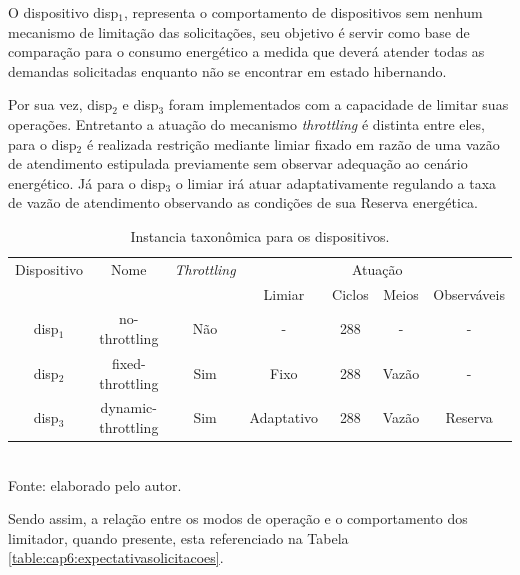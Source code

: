 \begingroup


O dispositivo disp$_1$, representa o comportamento de dispositivos sem nenhum mecanismo de limitação das solicitações, seu objetivo é servir como base de comparação para o consumo energético a medida que deverá atender todas as demandas solicitadas enquanto não se encontrar em estado hibernando.

Por sua vez, disp$_2$  e disp$_3$ foram implementados com a capacidade de limitar suas operações. Entretanto a atuação do mecanismo \textit{throttling} é distinta entre eles, para o disp$_2$ é realizada restrição mediante limiar fixado em razão de uma vazão de atendimento estipulada previamente sem observar adequação ao cenário energético. Já para o disp$_3$ o limiar irá atuar adaptativamente regulando a taxa de vazão de atendimento observando as condições de sua Reserva energética.

\begin{table}[htbp]
	
	\centering
	\caption{Instancia taxonômica para os dispositivos.}
	\small
	\begin{tabular}{ c c c c c c c}
		\toprule
		Dispositivo & Nome & \textit{Throttling} & \multicolumn{4}{c}{Atuação}\\\cline{4-7}		
		& & & Limiar & Ciclos & Meios & Observáveis\\
		\midrule
		disp$_1$ & no-throttling  & Não & - & 288 & - & - \\
		disp$_2$ & fixed-throttling  & Sim & Fixo & 288 & Vazão & - \\
		disp$_3$ & dynamic-throttling  & Sim & Adaptativo & 288 & Vazão & Reserva \\
		\bottomrule
	\end{tabular}
	\label{table:cap6:dispositivosutilizados}
	\\
	\footnotesize Fonte: elaborado pelo autor.
	
\end{table}
\endgroup

Sendo assim, a relação entre os modos de operação e o comportamento dos limitador, quando presente, esta referenciado na Tabela \ref{table:cap6:expectativasolicitacoes}.

